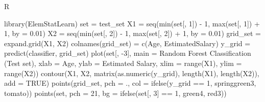 \documentclass[
]{book}
\newenvironment{Shaded}{\begin{snugshade}}{\end{snugshade}}
\newcommand{\AttributeTok}[1]{\textcolor[rgb]{0.77,0.63,0.00}{#1}}
\newcommand{\ConstantTok}[1]{\textcolor[rgb]{0.00,0.00,0.00}{#1}}
\newcommand{\DecValTok}[1]{\textcolor[rgb]{0.00,0.00,0.81}{#1}}
\newcommand{\FloatTok}[1]{\textcolor[rgb]{0.00,0.00,0.81}{#1}}
\newcommand{\FunctionTok}[1]{\textcolor[rgb]{0.00,0.00,0.00}{#1}}
\newcommand{\NormalTok}[1]{#1}
\newcommand{\OtherTok}[1]{\textcolor[rgb]{0.56,0.35,0.01}{#1}}
\newcommand{\SpecialCharTok}[1]{\textcolor[rgb]{0.00,0.00,0.00}{#1}}
\newcommand{\StringTok}[1]{\textcolor[rgb]{0.31,0.60,0.02}{#1}}
\theoremstyle{definition}
\theoremstyle{definition}
\theoremstyle{definition}
\theoremstyle{definition}
\theoremstyle{remark}
\begin{document}
R

\begin{Shaded}
\begin{Highlighting}[]
\FunctionTok{library}\NormalTok{(ElemStatLearn)}
\NormalTok{set }\OtherTok{=}\NormalTok{ test\_set}
\NormalTok{X1 }\OtherTok{=} \FunctionTok{seq}\NormalTok{(}\FunctionTok{min}\NormalTok{(set[, }\DecValTok{1}\NormalTok{]) }\SpecialCharTok{{-}} \DecValTok{1}\NormalTok{, }\FunctionTok{max}\NormalTok{(set[, }\DecValTok{1}\NormalTok{]) }\SpecialCharTok{+} \DecValTok{1}\NormalTok{, }\AttributeTok{by =} \FloatTok{0.01}\NormalTok{)}
\NormalTok{X2 }\OtherTok{=} \FunctionTok{seq}\NormalTok{(}\FunctionTok{min}\NormalTok{(set[, }\DecValTok{2}\NormalTok{]) }\SpecialCharTok{{-}} \DecValTok{1}\NormalTok{, }\FunctionTok{max}\NormalTok{(set[, }\DecValTok{2}\NormalTok{]) }\SpecialCharTok{+} \DecValTok{1}\NormalTok{, }\AttributeTok{by =} \FloatTok{0.01}\NormalTok{)}
\NormalTok{grid\_set }\OtherTok{=} \FunctionTok{expand.grid}\NormalTok{(X1, X2)}
\FunctionTok{colnames}\NormalTok{(grid\_set) }\OtherTok{=} \FunctionTok{c}\NormalTok{(}\StringTok{\textquotesingle{}Age\textquotesingle{}}\NormalTok{, }\StringTok{\textquotesingle{}EstimatedSalary\textquotesingle{}}\NormalTok{)}
\NormalTok{y\_grid }\OtherTok{=} \FunctionTok{predict}\NormalTok{(classifier, grid\_set)}
\FunctionTok{plot}\NormalTok{(set[, }\SpecialCharTok{{-}}\DecValTok{3}\NormalTok{], }\AttributeTok{main =} \StringTok{\textquotesingle{}Random Forest Classification (Test set)\textquotesingle{}}\NormalTok{,}
     \AttributeTok{xlab =} \StringTok{\textquotesingle{}Age\textquotesingle{}}\NormalTok{, }\AttributeTok{ylab =} \StringTok{\textquotesingle{}Estimated Salary\textquotesingle{}}\NormalTok{,}
     \AttributeTok{xlim =} \FunctionTok{range}\NormalTok{(X1), }\AttributeTok{ylim =} \FunctionTok{range}\NormalTok{(X2))}
\FunctionTok{contour}\NormalTok{(X1, X2, }\FunctionTok{matrix}\NormalTok{(}\FunctionTok{as.numeric}\NormalTok{(y\_grid), }\FunctionTok{length}\NormalTok{(X1), }\FunctionTok{length}\NormalTok{(X2)), }\AttributeTok{add =} \ConstantTok{TRUE}\NormalTok{)}
\FunctionTok{points}\NormalTok{(grid\_set, }\AttributeTok{pch =} \StringTok{\textquotesingle{}.\textquotesingle{}}\NormalTok{, }\AttributeTok{col =} \FunctionTok{ifelse}\NormalTok{(y\_grid }\SpecialCharTok{==} \DecValTok{1}\NormalTok{, }\StringTok{\textquotesingle{}springgreen3\textquotesingle{}}\NormalTok{, }\StringTok{\textquotesingle{}tomato\textquotesingle{}}\NormalTok{))}
\FunctionTok{points}\NormalTok{(set, }\AttributeTok{pch =} \DecValTok{21}\NormalTok{, }\AttributeTok{bg =} \FunctionTok{ifelse}\NormalTok{(set[, }\DecValTok{3}\NormalTok{] }\SpecialCharTok{==} \DecValTok{1}\NormalTok{, }\StringTok{\textquotesingle{}green4\textquotesingle{}}\NormalTok{, }\StringTok{\textquotesingle{}red3\textquotesingle{}}\NormalTok{))}
\end{Highlighting}
\end{Shaded}
\end{document}
